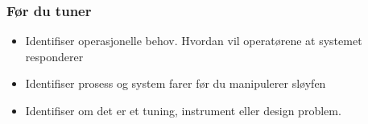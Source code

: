 \documentclass[aspectratio=169,xcolor=dvipsnames]{beamer}
\begin{document}
%
%
%
%
%
	\begin{frame}
		\frametitle{Før du tuner}
		\begin{itemize}
			\item Identifiser operasjonelle behov. Hvordan vil operatørene at systemet responderer
			\item Identifiser prosess og system farer før du manipulerer sløyfen
			\item Identifiser om det er et tuning, instrument eller design problem. 
		\end{itemize}
		
	\end{frame}
\end{document}
